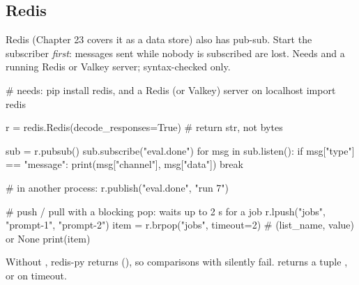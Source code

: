 \begin{center}
\end{center}

\subsection{Redis}

Redis (Chapter 23 covers it as a data store) also has pub-sub. Start the subscriber
\emph{first}: messages sent while nobody is subscribed are lost. Needs
 and a running Redis or Valkey server; syntax-checked only.

\begin{pycode}
# needs: pip install redis, and a Redis (or Valkey) server on localhost
import redis

r = redis.Redis(decode_responses=True)         # return str, not bytes

sub = r.pubsub()
sub.subscribe("eval.done")
for msg in sub.listen():
    if msg["type"] == "message":
        print(msg["channel"], msg["data"])
        break

# in another process:  r.publish("eval.done", "run 7")

# push / pull with a blocking pop: waits up to 2 s for a job
r.lpush("jobs", "prompt-1", "prompt-2")
item = r.brpop("jobs", timeout=2)              # (list_name, value) or None
print(item)
\end{pycode}

\begin{typecheck}
Without , redis-py returns  (),
so comparisons with  silently fail.  returns a tuple
, or  on timeout.
\end{typecheck}

